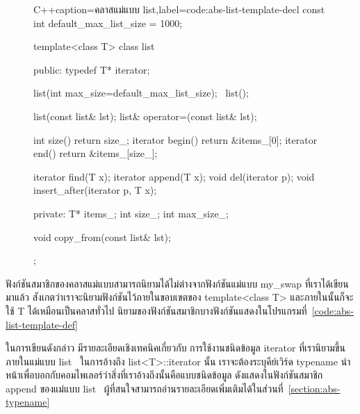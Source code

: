 \begin{figure}
\latintext
\begin{codelist}{C++}{caption={\thaitext ค{\wbr}ลา{\wbr}ส{\wbr}แม่แบบ {\ct list}\latintext},label=code:abs-list-template-decl}
const int default_max_list_size = 1000;

template<class T>
class list {
public:
  typedef T* iterator;

  list(int max_size=default_max_list_size);
  ~list();

  list(const list& lst);
  list& operator=(const list& lst);

  int size() { return size_; }
  iterator begin() { return &items_[0]; }
  iterator end() { return &items_[size_]; }

  iterator find(T x);
  iterator append(T x);
  void del(iterator p);
  void insert_after(iterator p, T x);

private:
  T* items_;
  int size_;
  int max_size_;

  void copy_from(const list& lst);
};
\end{codelist}
\thaitext
\end{figure}

ฟังก์ชัน{\wbr}สมาชิก{\wbr}ของ{\wbr}ค{\wbr}ลา{\wbr}ส{\wbr}แม่แบบ{\wbr}สามารถ{\wbr}นิยาม{\wbr}ได้{\wbr}ไม่{\wbr}ต่าง{\wbr}จาก{\wbr}ฟังก์ชัน{\wbr}แม่แบบ {\ct my\_swap}
ที่{\wbr}เรา{\wbr}ได้{\wbr}เขียน{\wbr}มา{\wbr}แล้ว สังเกต{\wbr}ว่า{\wbr}เรา{\wbr}จะ{\wbr}นิยาม{\wbr}ฟังก์ชัน{\wbr}ไว้{\wbr}ภายใน{\wbr}ขอบเขต{\wbr}ของ {\ct
  template<class T>} และ{\wbr}ภายใน{\wbr}นั้น{\wbr}ก็{\wbr}จะ{\wbr}ใช้ {\ct T} ได้{\wbr}เหมือน{\wbr}เป็น{\wbr}ค{\wbr}ลา{\wbr}ส{\wbr}ทั่วไป{\wbr}
นิยาม{\wbr}ของ{\wbr}ฟังก์ชัน{\wbr}สมาชิก{\wbr}บาง{\wbr}ฟังก์ชัน{\wbr}แสดง{\wbr}ใน{\wbr}โปรแกรม{\wbr}ที่~\ref{code:abs-list-template-def}

ใน{\wbr}การ{\wbr}เขียน{\wbr}ดังกล่าว มี{\wbr}รายละเอียด{\wbr}เชิง{\wbr}เทคนิค{\wbr}เกี่ยวกับ การ{\wbr}ใช้{\wbr}งาน{\wbr}ชนิด{\wbr}ข้อมูล {\ct
  iterator} ที่{\wbr}เรา{\wbr}นิยาม{\wbr}ขึ้น{\wbr}ภายใน{\wbr}แม่แบบ {\ct list} \ ใน{\wbr}การ{\wbr}อ้าง{\wbr}ถึง {\ct
  list<T>::iterator} นั้น เรา{\wbr}จะ{\wbr}ต้อง{\wbr}ระบุ{\wbr}คีย์{\wbr}เวิร์ด {\ct typename}
นำหน้า{\wbr}เพื่อ{\wbr}บอก{\wbr}กับ{\wbr}คอม{\wbr}ไพ{\wbr}เลอร์{\wbr}ว่า{\wbr}สิ่ง{\wbr}ที่{\wbr}เรา{\wbr}อ้าง{\wbr}ถึง{\wbr}นั้น{\wbr}คือ{\wbr}แบบ{\wbr}ชนิด{\wbr}ข้อมูล ดัง{\wbr}แสดง{\wbr}ใน{\wbr}ฟังก์ชัน{\wbr}สมาชิก{\wbr}
{\ct append} ของ{\wbr}แม่แบบ {\ct list}
\ ผู้{\wbr}ที่{\wbr}สนใจ{\wbr}สามารถ{\wbr}อ่าน{\wbr}รายละเอียด{\wbr}เพิ่มเติม{\wbr}ได้{\wbr}ใน{\wbr}ส่วน{\wbr}ที่~\ref{section:abs-typename}


